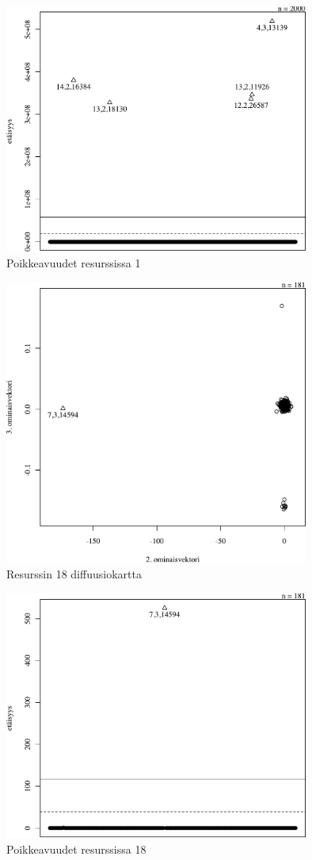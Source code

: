 \begin{figure}[p]
\centering
\includegraphics[width=10cm]{pics/tiheyskuvat/service_1.pdf}
\caption{Poikkeavuudet resurssissa 1}
\label{service_1}
\end{figure}

\begin{figure}[p]
\centering
\includegraphics[width=10cm]{pics/diffuusiokuvat/service_18.pdf}
\caption{Resurssin 18 diffuusiokartta}
\label{diffusio_18}
\end{figure}

\begin{figure}[p]
\centering
\includegraphics[width=10cm]{pics/tiheyskuvat/service_18.pdf}
\caption{Poikkeavuudet resurssissa 18}
\label{service_18}
\end{figure}

